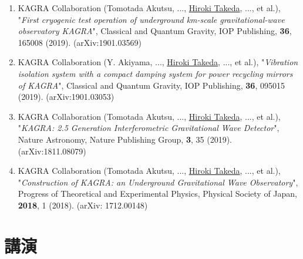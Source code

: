 \documentclass[uplatex, 11pt]{jsarticle}
\begin{document}
\begin{enumerate}
\item KAGRA Collaboration (Tomotada Akutsu, ..., \uline{Hiroki Takeda}, ..., et al.), "\emph{First cryogenic test operation of underground km-scale gravitational-wave observatory KAGRA}", Classical and Quantum Gravity, IOP Publishing, {\bf 36}, 165008 (2019). (arXiv:1901.03569)\\

\item KAGRA Collaboration (Y. Akiyama, ..., \uline{Hiroki Takeda}, ..., et al.), "\emph{Vibration isolation system with a compact damping system for power recycling mirrors of KAGRA}", Classical and Quantum Gravity, IOP Publishing, {\bf 36}, 095015 (2019). (arXiv:1901.03053)\\

\item KAGRA Collaboration (Tomotada Akutsu, ..., \uline{Hiroki Takeda}, ..., et al.), "\emph{KAGRA: 2.5 Generation Interferometric Gravitational Wave Detector}", Nature Astronomy, Nature Publishing Group, {\bf 3}, 35 (2019). (arXiv:1811.08079)\\

\item KAGRA Collaboration (Tomotada Akutsu, ..., \uline{Hiroki Takeda}, ..., et al.), "\emph{Construction of KAGRA: an Underground Gravitational Wave Observatory}", Progress of Theoretical and Experimental Physics, Physical Society of Japan, {\bf 2018}, 1 (2018). (arXiv: 1712.00148)

\end{enumerate}


\section*{講演}
\end{document}
